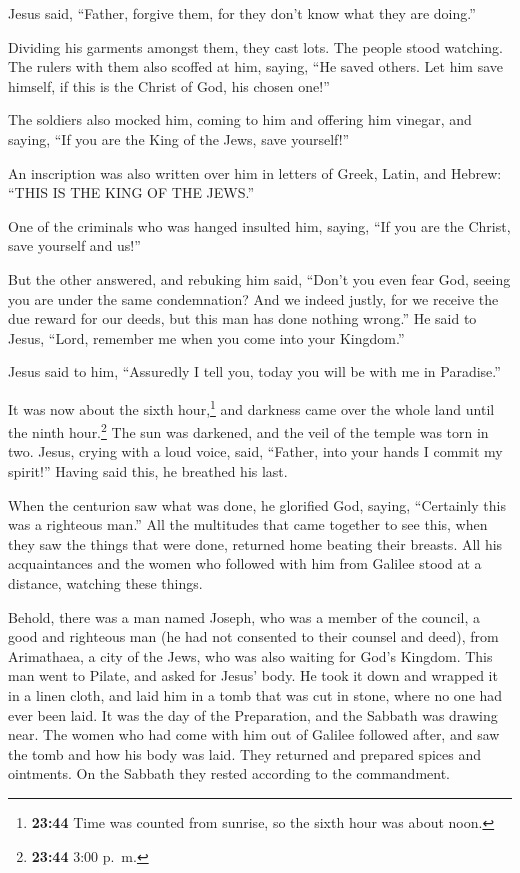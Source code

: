  Jesus said, ``Father, forgive them, for they don't know
what they are doing.''

Dividing his garments amongst them, they cast lots.  The
people stood watching. The rulers with them also scoffed at him, saying,
``He saved others. Let him save himself, if this is the Christ of God,
his chosen one!''

 The soldiers also mocked him, coming to him and offering
him vinegar,  and saying, ``If you are the King of the
Jews, save yourself!''

 An inscription was also written over him in letters of
Greek, Latin, and Hebrew: ``THIS IS THE KING OF THE JEWS.''

 One of the criminals who was hanged insulted him,
saying, ``If you are the Christ, save yourself and us!''

 But the other answered, and rebuking him said, ``Don't
you even fear God, seeing you are under the same condemnation?
 And we indeed justly, for we receive the due reward for
our deeds, but this man has done nothing wrong.''  He
said to Jesus, ``Lord, remember me when you come into your Kingdom.''

 Jesus said to him, ``Assuredly I tell you, today you
will be with me in Paradise.''

 It was now about the sixth hour,\footnote{\textbf{23:44}
  Time was counted from sunrise, so the sixth hour was about noon.} and
darkness came over the whole land until the ninth hour.\footnote{\textbf{23:44}
  3:00 p.~m.}  The sun was darkened, and the veil of the
temple was torn in two.  Jesus, crying with a loud voice,
said, ``Father, into your hands I commit my spirit!'' Having said this,
he breathed his last.

 When the centurion saw what was done, he glorified God,
saying, ``Certainly this was a righteous man.''  All the
multitudes that came together to see this, when they saw the things that
were done, returned home beating their breasts.  All his
acquaintances and the women who followed with him from Galilee stood at
a distance, watching these things.

 Behold, there was a man named Joseph, who was a member
of the council, a good and righteous man  (he had not
consented to their counsel and deed), from Arimathaea, a city of the
Jews, who was also waiting for God's Kingdom.  This man
went to Pilate, and asked for Jesus' body.  He took it
down and wrapped it in a linen cloth, and laid him in a tomb that was
cut in stone, where no one had ever been laid.  It was
the day of the Preparation, and the Sabbath was drawing near.
 The women who had come with him out of Galilee followed
after, and saw the tomb and how his body was laid.  They
returned and prepared spices and ointments. On the Sabbath they rested
according to the commandment.

